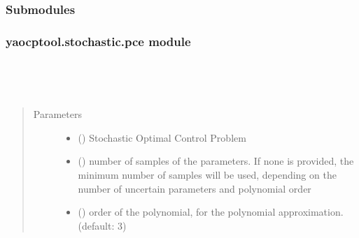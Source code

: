 \documentclass[letterpaper,10pt,english]{sphinxmanual}
\begin{document}
\subsubsection{Submodules}
\label{\detokenize{yaocptool.stochastic:submodules}}

\subsubsection{yaocptool.stochastic.pce module}
\label{\detokenize{yaocptool.stochastic:module-yaocptool.stochastic.pce}}\label{\detokenize{yaocptool.stochastic:yaocptool-stochastic-pce-module}}

\begin{fulllineitems}
\label{\detokenize{yaocptool.stochastic:yaocptool.stochastic.pce.PCEConverter}}~

\begin{fulllineitems}
\label{\detokenize{yaocptool.stochastic:yaocptool.stochastic.pce.PCEConverter.__init__}}~\begin{quote}\begin{description}
\item[{Parameters}] \leavevmode\begin{itemize}
\item {} 
 ({\hyperref[\detokenize{yaocptool.modelling:yaocptool.modelling.stochastic_ocp.StochasticOCP}]{}}) \textendash{} Stochastic Optimal Control Problem

\item {} 
 () \textendash{} number of samples of the parameters. If none is provided, the minimum number of samples
will be used, depending on the number of uncertain parameters and polynomial order

\item {} 
 () \textendash{} order of the polynomial, for the polynomial approximation. (default: 3)


\end{itemize}
\end{description}
\end{quote}
\end{fulllineitems}
\end{fulllineitems}
\end{document}
